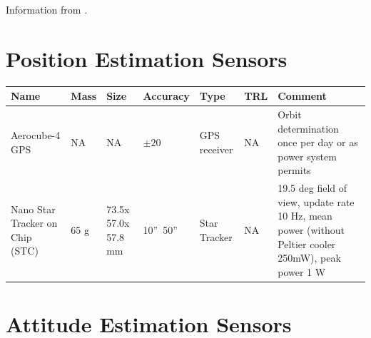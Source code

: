 \documentclass[english]{article}
\begin{document}

Information from \cite{imu2}.

\section{Position Estimation Sensors}
\begin{center}

     \begin{tabular}{ |p{2cm} | p{1cm} | p{2cm} | l | l | l | p{5cm} |}
     \hline

      {\bf Name} & {\bf Mass} & {\bf Size} & {\bf Accuracy} & {\bf Type} & {\bf TRL} & {\bf Comment}  \\ \hline

     Aerocube-4 GPS \cite{Gangestad} & NA & NA &  {$ \pm 20 $} & GPS receiver & NA & Orbit determination once per day or as power system permits \\ \hline

     Nano Star Tracker on Chip (STC) \cite{Prokhorov} & 65 g & 73.5x 57.0x 57.8 mm & 10''~50'' & Star Tracker & NA & 19.5 deg field of view, update rate 10 Hz, mean power (without Peltier cooler 250mW), peak power 1 W \\ \hline
     \end{tabular}
\end{center}

\section{Attitude Estimation Sensors}
\end{document}
